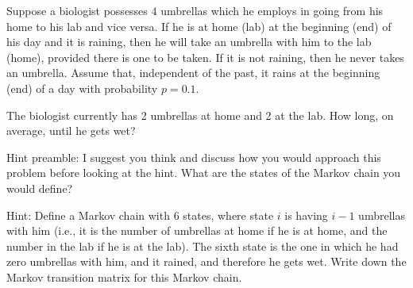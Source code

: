\documentclass[12pt,letterpaper]{article}
\begin{document}





Suppose a biologist possesses $4$ umbrellas which he employs in going from his home to his lab and vice versa. If he is at home (lab) at the beginning (end) of his day and it is raining, then he will take an umbrella with him to the lab (home), provided there is one to be taken. If it is not raining, then he never takes an umbrella. Assume that, independent of the past, it rains at the beginning (end) of a day with probability $p=0.1$.

The biologist currently has 2 umbrellas at home and 2 at the lab. How long, on average, until he gets wet? 

\vspace{3em}

Hint preamble: I suggest you think and discuss how you would approach this problem before looking at the hint. What are the states of the Markov chain you would define?

Hint: Define a Markov chain with $6$ states, where state $i$ is having $i-1$ umbrellas with him (i.e., it is the number of umbrellas at home if he is at home, and the number in the lab if he is at the lab). The sixth state is the one in which he had zero umbrellas with him, and it rained, and therefore he gets wet. Write down the Markov transition matrix for this Markov chain. 



\end{document}
